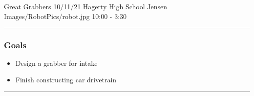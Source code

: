 \insertmeeting 
	{Great Grabbers} 
	{10/11/21}
	{Hagerty High School}
	{Jensen}
	{Images/RobotPics/robot.jpg}
	{10:00 - 3:30}
	
\noindent\hfil\rule{\textwidth}{.4pt}\hfil
\subsubsection*{Goals}
\begin{itemize}
    \item Design a grabber for intake
    \item Finish constructing car drivetrain  

\end{itemize} 

\noindent\hfil\rule{\textwidth}{.4pt}\hfil

